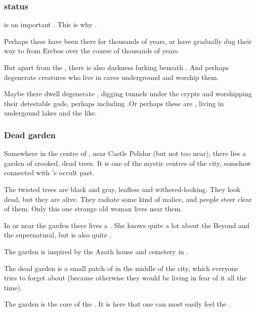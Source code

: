 \subsubsection{\Nexus{} status}
\Malcur is an important \nexus{}. This is why . 

Perhaps these \ghobaleth{} have been there for thousands of years, or have gradually dug their way to \Malcur from Erebos over the course of thousands of years. 

But apart from the \ghobaleth, there is also  darkness lurking beneath \Malcur. And perhaps degenerate creatures who live in caves underground and worship them. 

Maybe there dwell degenerate \troglodytes, digging tunnels under the crypts and worshipping their detestable gods, perhaps including \dragons.Or perhaps these are \nagae, living in undergound lakes and the like.





\subsubsection{Dead garden}
Somewhere in the centre of \Malcur, near Castle Pelidor (but not too near), there lies a garden of crooked, dead trees. 
It is one of the mystic centres of the city, somehow connected with \Malcur's occult past. 

The twisted trees are black and gray, leafless and withered-looking. They look dead, but they are alive. They radiate some kind of malice, and people steer clear of them. Only this one strange old woman lives near them. 

In or near the garden there lives a . 
She knows quite a lot about the Beyond and the supernatural, but is also quite .

The garden is inspired by the Azath house and cemetery in \cite{StevenErikson:MidnightTides}. 

The dead garden is a small patch of \wylde in the middle of the city, which everyone tries to forget about (because otherwise they would be living in fear of it all the time).

The garden is the core of the \nexus. It is here that one can most easily feel the . 

